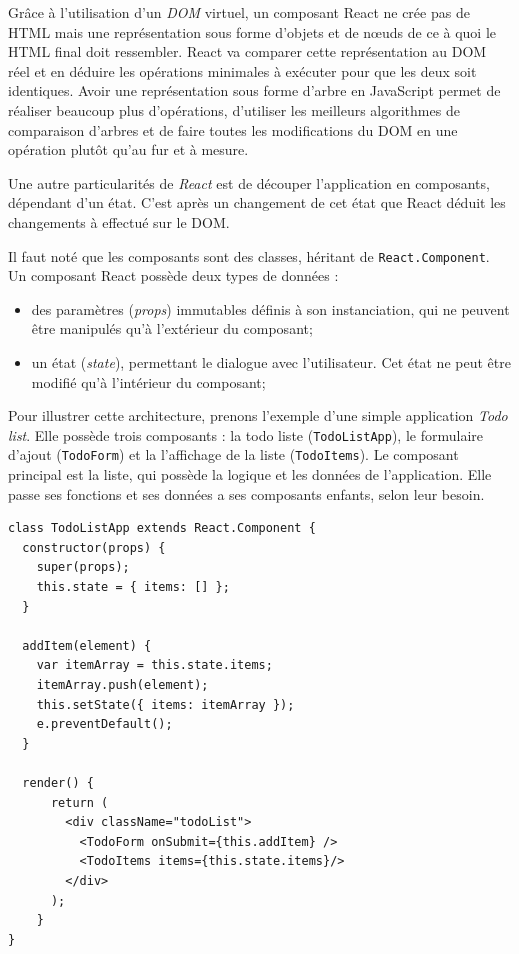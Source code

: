 \bigskip

Grâce à l'utilisation d'un \emph{DOM} virtuel, un composant React ne
crée pas de HTML mais une représentation sous forme d'objets et de nœuds
de ce à quoi le HTML final doit ressembler. React va comparer cette
représentation au DOM réel et en déduire les opérations minimales à
exécuter pour que les deux soit identiques. Avoir une représentation
sous forme d'arbre en JavaScript permet de réaliser beaucoup plus
d'opérations, d'utiliser les meilleurs algorithmes de comparaison
d'arbres et de faire toutes les modifications du DOM en une opération
plutôt qu'au fur et à mesure.

\bigskip

Une autre particularités de \emph{React} est de découper l'application
en composants, dépendant d'un état. C'est après un changement de cet
état que React déduit les changements à effectué sur le DOM.

\bigskip

Il faut noté que les composants sont des classes, héritant de
\texttt{React.Component}. Un composant React possède deux types de
données :

\begin{itemize}
\tightlist
\item
  des paramètres (\emph{props}) immutables définis à son instanciation,
  qui ne peuvent être manipulés qu'à l'extérieur du composant;
\item
  un état (\emph{state}), permettant le dialogue avec l'utilisateur. Cet
  état ne peut être modifié qu'à l'intérieur du composant;
\end{itemize}

\bigskip

Pour illustrer cette architecture, prenons l'exemple d'une simple
application \emph{Todo list}. Elle possède trois composants : la todo
liste (\texttt{TodoListApp}), le formulaire d'ajout (\texttt{TodoForm})
et la l'affichage de la liste (\texttt{TodoItems}). Le composant
principal est la liste, qui possède la logique et les données de
l'application. Elle passe ses fonctions et ses données a ses composants
enfants, selon leur besoin.

\begin{verbatim}
class TodoListApp extends React.Component {
  constructor(props) {
    super(props);
    this.state = { items: [] };
  }

  addItem(element) {
    var itemArray = this.state.items;
    itemArray.push(element);
    this.setState({ items: itemArray });
    e.preventDefault();
  }

  render() {
      return (
        <div className="todoList">
          <TodoForm onSubmit={this.addItem} />
          <TodoItems items={this.state.items}/>
        </div>
      );
    }
}
\end{verbatim}

